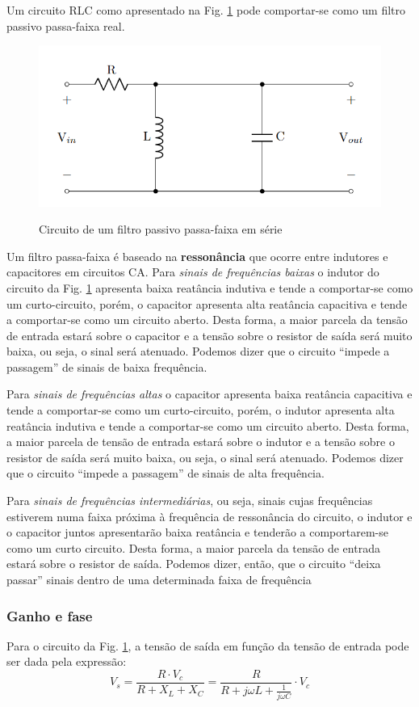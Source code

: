 \documentclass[letterpaper, 12pt]{article}
\begin{document}
Um circuito RLC como apresentado na Fig. \ref{fig:RLC Circuit} pode comportar-se como um filtro passivo passa-faixa real.
\begin{figure}[h]
    \centering
    \includegraphics[width=0.5\linewidth]{figures/Band-pass_filter.png}
    \label{fig:RLC Circuit}
    \caption{Circuito de um filtro passivo passa-faixa em série}
\end{figure}

Um filtro passa-faixa é baseado na \textbf{ressonância} que ocorre entre indutores e capacitores em circuitos CA. Para \textit{sinais de frequências baixas} o indutor do circuito da Fig. \ref{fig:RLC Circuit} apresenta baixa reatância indutiva e tende a comportar-se como um curto-circuito, porém, o capacitor apresenta alta reatância capacitiva e tende a comportar-se como um circuito aberto. Desta forma, a maior
parcela da tensão de entrada estará sobre o capacitor e a tensão sobre o resistor de saída será muito baixa, ou seja, o sinal será atenuado. Podemos dizer que o circuito “impede a passagem” de sinais de baixa frequência.

Para \textit{sinais de frequências altas} o capacitor apresenta baixa reatância capacitiva e tende a comportar-se como um curto-circuito, porém, o indutor apresenta alta reatância indutiva e tende a comportar-se como um circuito aberto. Desta forma, a maior parcela de tensão de entrada estará sobre o indutor e a tensão sobre o resistor de saída será muito baixa, ou seja, o sinal será atenuado. Podemos dizer que o circuito “impede a passagem” de sinais de alta frequência.

Para \textit{sinais de frequências intermediárias}, ou seja, sinais cujas frequências estiverem numa faixa próxima à frequência de ressonância do circuito, o indutor e o capacitor juntos apresentarão baixa reatância e tenderão a comportarem-se como um curto circuito. Desta forma, a maior parcela da tensão de entrada estará sobre o resistor de saída. Podemos dizer, então, que o circuito “deixa passar” sinais dentro de uma determinada faixa de frequência


\subsubsection{Ganho e fase}\label{SubSubSec - Ganho e fase 1}
Para o circuito da Fig. \ref{fig:RLC Circuit}, a tensão de saída em função da tensão de entrada pode ser dada pela expressão:
\begin{equation}\label{V_s}
    V_{s}=\frac{R\cdot V_{c}}{R+X_{L}+X_{C}}=\frac{R}{R+j\omega L+\frac{1}{j\omega C}}\cdot V_{c}
\end{equation}
\end{document}
